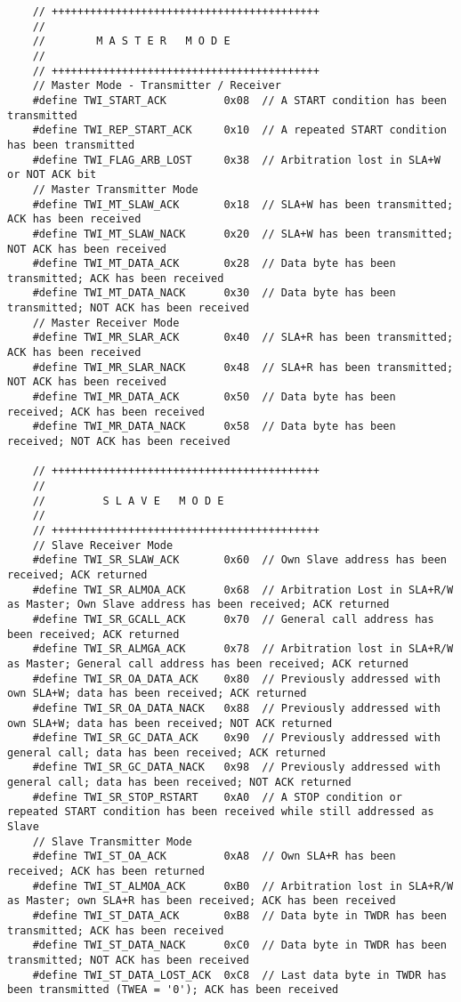 \begin{lstlisting}
	// ++++++++++++++++++++++++++++++++++++++++++
	//
	//        M A S T E R   M O D E
	//
	// ++++++++++++++++++++++++++++++++++++++++++  
	// Master Mode - Transmitter / Receiver
	#define TWI_START_ACK         0x08  // A START condition has been transmitted
	#define TWI_REP_START_ACK     0x10  // A repeated START condition has been transmitted
	#define TWI_FLAG_ARB_LOST     0x38  // Arbitration lost in SLA+W or NOT ACK bit
	// Master Transmitter Mode
	#define TWI_MT_SLAW_ACK       0x18  // SLA+W has been transmitted; ACK has been received
	#define TWI_MT_SLAW_NACK      0x20  // SLA+W has been transmitted; NOT ACK has been received
	#define TWI_MT_DATA_ACK       0x28  // Data byte has been transmitted; ACK has been received
	#define TWI_MT_DATA_NACK      0x30  // Data byte has been transmitted; NOT ACK has been received  
	// Master Receiver Mode
	#define TWI_MR_SLAR_ACK       0x40  // SLA+R has been transmitted; ACK has been received
	#define TWI_MR_SLAR_NACK      0x48  // SLA+R has been transmitted; NOT ACK has been received
	#define TWI_MR_DATA_ACK       0x50  // Data byte has been received; ACK has been received
	#define TWI_MR_DATA_NACK      0x58  // Data byte has been received; NOT ACK has been received
	
	// ++++++++++++++++++++++++++++++++++++++++++
	//
	//         S L A V E   M O D E
	//
	// ++++++++++++++++++++++++++++++++++++++++++
	// Slave Receiver Mode
	#define TWI_SR_SLAW_ACK       0x60  // Own Slave address has been received; ACK returned
	#define TWI_SR_ALMOA_ACK      0x68  // Arbitration Lost in SLA+R/W as Master; Own Slave address has been received; ACK returned
	#define TWI_SR_GCALL_ACK      0x70  // General call address has been received; ACK returned
	#define TWI_SR_ALMGA_ACK      0x78  // Arbitration lost in SLA+R/W as Master; General call address has been received; ACK returned  
	#define TWI_SR_OA_DATA_ACK    0x80  // Previously addressed with own SLA+W; data has been received; ACK returned
	#define TWI_SR_OA_DATA_NACK   0x88  // Previously addressed with own SLA+W; data has been received; NOT ACK returned
	#define TWI_SR_GC_DATA_ACK    0x90  // Previously addressed with general call; data has been received; ACK returned
	#define TWI_SR_GC_DATA_NACK   0x98  // Previously addressed with general call; data has been received; NOT ACK returned
	#define TWI_SR_STOP_RSTART    0xA0  // A STOP condition or repeated START condition has been received while still addressed as Slave
	// Slave Transmitter Mode
	#define TWI_ST_OA_ACK         0xA8  // Own SLA+R has been received; ACK has been returned
	#define TWI_ST_ALMOA_ACK      0xB0  // Arbitration lost in SLA+R/W as Master; own SLA+R has been received; ACK has been received
	#define TWI_ST_DATA_ACK       0xB8  // Data byte in TWDR has been transmitted; ACK has been received
	#define TWI_ST_DATA_NACK      0xC0  // Data byte in TWDR has been transmitted; NOT ACK has been received
	#define TWI_ST_DATA_LOST_ACK  0xC8  // Last data byte in TWDR has been transmitted (TWEA = '0'); ACK has been received
	

\end{lstlisting}
